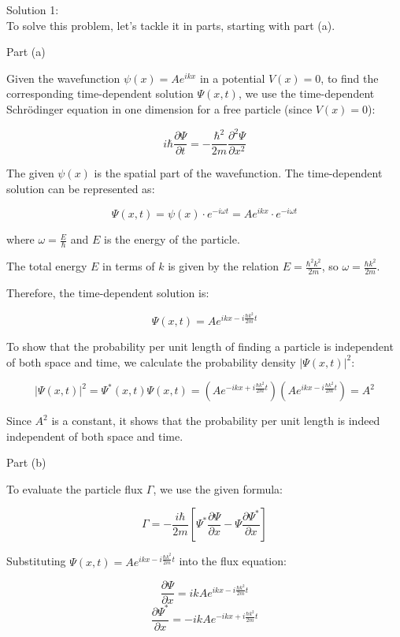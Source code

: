 \documentclass[a4paper,11pt]{article}
\begin{document}
\bigskip

\noindent Solution 1: \\ 

To solve this problem, let's tackle it in parts, starting with part (a).

Part (a)

Given the wavefunction \( \psi(x) = Ae^{ikx} \) in a potential \( V(x) = 0 \), to find the corresponding time-dependent solution \( \Psi(x,t) \), we use the time-dependent Schrödinger equation in one dimension for a free particle (since \( V(x) = 0 \)):

\[ i\hbar \frac{\partial \Psi}{\partial t} = -\frac{\hbar^2}{2m} \frac{\partial^2 \Psi}{\partial x^2} \]

The given \( \psi(x) \) is the spatial part of the wavefunction. The time-dependent solution can be represented as:

\[ \Psi(x,t) = \psi(x) \cdot e^{-i\omega t} = Ae^{ikx} \cdot e^{-i\omega t} \]

where \( \omega = \frac{E}{\hbar} \) and \( E \) is the energy of the particle.

The total energy \( E \) in terms of \( k \) is given by the relation \( E = \frac{\hbar^2k^2}{2m} \), so \( \omega = \frac{\hbar k^2}{2m} \).

Therefore, the time-dependent solution is:

\[ \Psi(x,t) = Ae^{ikx - i\frac{\hbar k^2}{2m}t} \]

To show that the probability per unit length of finding a particle is independent of both space and time, we calculate the probability density \( |\Psi(x,t)|^2 \):

\[ |\Psi(x,t)|^2 = \Psi^{*}(x,t) \Psi(x,t) = \left(Ae^{-ikx + i\frac{\hbar k^2}{2m}t}\right) \left(Ae^{ikx - i\frac{\hbar k^2}{2m}t}\right) = A^2 \]

Since \( A^2 \) is a constant, it shows that the probability per unit length is indeed independent of both space and time.

Part (b)

To evaluate the particle flux \( \Gamma \), we use the given formula:

\[ \Gamma = -\frac{i\hbar}{2m}\left[ \Psi^{*}\frac{\partial\Psi}{\partial x} - \Psi\frac{\partial\Psi^{*}}{\partial x} \right] \]

Substituting \( \Psi(x,t) = Ae^{ikx - i\frac{\hbar k^2}{2m}t} \) into the flux equation:

\[ \frac{\partial\Psi}{\partial x} = ikAe^{ikx - i\frac{\hbar k^2}{2m}t} \]
\[ \frac{\partial\Psi^{*}}{\partial x} = -ikAe^{-ikx + i\frac{\hbar k^2}{2m}t} \]
\end{document}
